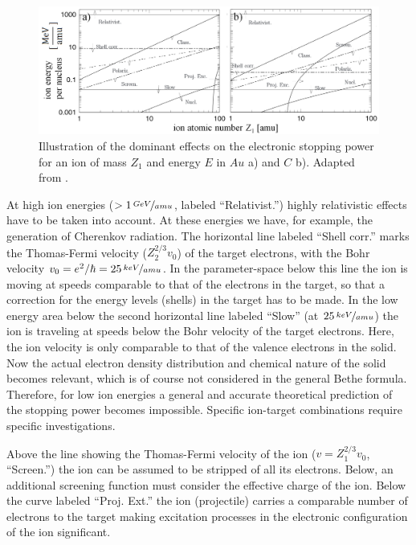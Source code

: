 \begin{figure}[h]
	\centering
		\includegraphics[width=.99\textwidth]{images/StoppinginAuandC.png}
	\caption{Illustration of the dominant effects on the electronic stopping power for an ion of mass $Z_1$ and energy $E$ in $Au$ a) and $C$ b). Adapted from \cite{sigmund_stopping_2004}.} 
	\label{stopping}
\end{figure} 


At high ion energies ($ > 1\,\nicefrac{GeV}{amu}$, labeled ``Relativist.'') highly relativistic effects have to be taken into account. At these energies we have, for example, the generation of Cherenkov radiation. The horizontal line labeled ``Shell corr.'' marks the Thomas-Fermi velocity ($Z_2^{2/3}v_0$) of the target electrons, with the Bohr velocity $v_0 = e^2/\hbar = 25\,\nicefrac{keV}{amu}$. In the parameter-space below this line the ion is moving at speeds comparable to that of the electrons in the target, so that a correction for the energy levels (shells) in the target has to be made. In the low energy area below the second horizontal line labeled ``Slow'' (at $25\,\nicefrac{keV}{amu}$) the ion is traveling at speeds below the Bohr velocity of the target electrons. Here, the ion velocity is only comparable to that of the valence electrons in the solid. Now the actual electron density distribution and chemical nature of the solid becomes relevant, which is of course not considered in the general Bethe formula. Therefore, for low ion energies a general and accurate theoretical prediction of the stopping power becomes impossible. Specific ion-target combinations require specific investigations.

Above the line showing the Thomas-Fermi velocity of the ion ($v = Z_1^{2/3}v_0$, ``Screen.'') the ion can be assumed to be stripped of all its electrons. Below, an additional screening function must consider the effective charge of the ion. Below the curve labeled ``Proj. Ext.'' the ion (projectile) carries a comparable number of electrons to the target making excitation processes in the electronic configuration of the ion significant.

